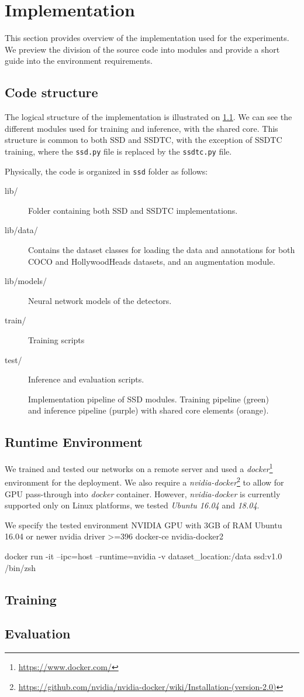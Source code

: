 \chapter{Implementation}
\label{app:impl}

This section provides overview of the implementation used for the experiments. We preview the division of the source code into modules and provide a short guide into the environment requirements.


\section{Code structure}
The logical structure of the implementation is illustrated on \cref{fig:logcode}. We can see the different modules used for training and inference, with the shared core. This structure is common to both SSD and SSDTC, with the exception of SSDTC training, where the {\tt ssd.py} file is replaced by the {\tt ssdtc.py} file.

Physically, the code is organized in {\tt ssd} folder as follows:
\begin{description}
\item[lib/] Folder containing both SSD and SSDTC implementations. 
\item[lib/data/] Contains the dataset classes for loading the data and annotations for both COCO and HollywoodHeads datasets, and an augmentation module.
\item[lib/models/] Neural network models of the detectors.
\item[train/] Training scripts
\item[test/] Inference and evaluation scripts.
\end{description}



\begin{figure}
    \centering
    \modules
    \caption[Implementation pipeline of SSD modules]{Implementation pipeline of SSD modules. Training pipeline (green) and inference pipeline (purple) with shared core elements (orange).}
    \label{fig:logcode}
\end{figure}


\section{Runtime Environment}
We trained and tested our networks on a remote server and used a \textit{docker}\footnote{\url{https://www.docker.com/}} environment for the deployment. We also require a \textit{nvidia-docker}\footnote{\url{https://github.com/nvidia/nvidia-docker/wiki/Installation-(version-2.0)}} to allow for GPU pass-through into \textit{docker} container. However, \textit{nvidia-docker} is currently supported only on Linux platforms, we tested \textit{Ubuntu 16.04} and \textit{18.04}. 



We specify the tested environment
NVIDIA GPU with 3GB of RAM
Ubuntu 16.04 or newer
nvidia driver >=396
docker-ce
nvidia-docker2

docker run -it --ipc=host --runtime=nvidia -v dataset\_location:/data ssd:v1.0 /bin/zsh


\section{Training}


\section{Evaluation}